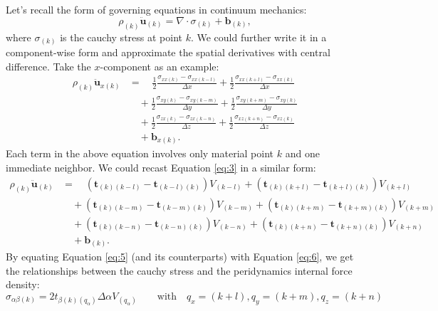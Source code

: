 \documentclass[11pt,fullpage]{article}
\newcommand{\mb}[1]{\mathbf{#1}}
\newcommand{\blue}[1]{#1}
\begin{document}
Let's recall the form of governing equations in continuum mechanics:
\begin{equation}
\rho_{(k)}\ddot{\mb{u}}_{(k)} = \nabla\cdot\sigma_{(k)} + \mb{b}_{(k)},
\label{eq:4}
\end{equation}
where $\sigma_{(k)}$ is the cauchy stress at point $k$. We could further write it in a component-wise form and approximate the spatial derivatives with central difference. Take the $x$-component as an example:
\begin{equation}
\begin{aligned}
\rho_{(k)}\ddot{\mb{u}}_{x(k)} &= \quad \frac{1}{2}\frac{\sigma_{xx(k)} - \sigma_{xx(k-l)}}{\Delta x} + \frac{1}{2}\frac{\sigma_{xx(k+l)} - \sigma_{xx(k)}}{\Delta x}\\
                              &\quad+  \frac{1}{2}\frac{\sigma_{xy(k)} - \sigma_{xy(k-m)}}{\Delta y} + \frac{1}{2}\frac{\sigma_{xy(k+m)} - \sigma_{xy(k)}}{\Delta y}\\
                              &\quad+  \frac{1}{2}\frac{\sigma_{zx(k)} - \sigma_{zx(k-n)}}{\Delta z} + \frac{1}{2}\frac{\sigma_{xz(k+n)} - \sigma_{xz(k)}}{\Delta z}\\
                              &\quad + \mb{b}_{x(k)}.
\end{aligned}
\label{eq:5}
\end{equation}
Each term in the above equation involves only material point $k$ and one immediate neighbor. We could recast Equation \blue{\ref{eq:3}} in a similar form:
\begin{equation}
\begin{aligned}
\rho_{(k)}\ddot{\mb{u}}_{(k)} &= \quad (\mb{t}_{(k)(k-l)} - \mb{t}_{(k-l)(k)})V_{(k-l)} + (\mb{t}_{(k)(k+l)} - \mb{t}_{(k+l)(k)})V_{(k+l)}\\
                             &\quad + (\mb{t}_{(k)(k-m)} - \mb{t}_{(k-m)(k)})V_{(k-m)} + (\mb{t}_{(k)(k+m)} - \mb{t}_{(k+m)(k)})V_{(k+m)}\\
                             &\quad + (\mb{t}_{(k)(k-n)} - \mb{t}_{(k-n)(k)})V_{(k-n)} + (\mb{t}_{(k)(k+n)} - \mb{t}_{(k+n)(k)})V_{(k+n)}\\
                             &\quad  + \mb{b}_{(k)}.
\end{aligned}
\label{eq:6}
\end{equation}
By equating Equation \blue{\ref{eq:5}} (and its counterparts) with Equation \blue{\ref{eq:6}}, we get the relationships between the cauchy stress and the peridynamics internal force density:
\begin{equation}
\sigma_{\alpha\beta(k)} = 2t_{\beta(k)(q_\alpha)}\Delta\alpha V_{(q_\alpha)}\qquad \mathrm{with } \quad q_x=(k+l),q_y=(k+m),q_z=(k+n)
\label{eq:7}
\end{equation}
\end{document}
